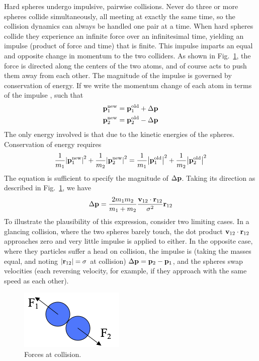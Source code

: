 \documentclass[]{article}
\begin{document}
Hard spheres undergo impulsive, pairwise collisions. Never do three or
more spheres collide simultaneously, all meeting at exactly the same
time, so the collision dynamics can always be handled one pair at a
time. When hard spheres collide they experience an infinite force over
an infinitesimal time, yielding an impulse (product of force and time)
that is finite. This impulse imparts an equal and opposite change in
momentum to the two colliders. As shown in Fig.~\ref{fig:force}, the force is
directed along the centers of the two atoms, and of course acts to push
them away from each other. The magnitude of the impulse is governed by
conservation of energy. If we write the momentum change of each atom in
terms of the impulse , such that
\begin{align*}
  &{\bf{p}}_1^{\rm new} = {\bf{p}}_1^{\rm old} + \Delta {\bf{p}}\\
  &{\bf{p}}_2^{\rm new} = {\bf{p}}_2^{\rm old} - \Delta {\bf{p}}
\end{align*}
The only energy involved is that due to the kinetic energies of the
spheres. Conservation of energy requires
\[\frac{1}{{{m_1}}}{\left| {{\bf{p}}_1^{\rm new}} \right|^2} + \frac{1}{{{m_2}}}{\left| {{\bf{p}}_2^{\rm new}} \right|^2} = \frac{1}{{{m_1}}}{\left| {{\bf{p}}_1^{\rm old}} \right|^2} + \frac{1}{{{m_2}}}{\left| {{\bf{p}}_2^{\rm old}} \right|^2}\]
The equation is sufficient to specify the magnitude of $\Delta {\bf{p}}$. Taking its
direction as described in Fig.~\ref{fig:force}, we have
\[\Delta {\bf{p}} = \frac{{2{m_1}{m_2}}}{{{m_1} + {m_2}}}\frac{{{{\bf{v}}_{12}} \cdot {{\bf{r}}_{12}}}}{{{\sigma ^2}}}{{\bf{r}}_{12}}\]
To illustrate the plausibility of this expression, consider two limiting
cases. In a glancing collision, where the two spheres barely touch, the
dot product ${\bf v}_{12}\cdot{\bf r}_{12}$ approaches zero and very little impulse is applied to
either. In the opposite case, where they particles suffer a head on
collision, the impulse is (taking the masses equal, and noting $|{\bf r}_{12}|=\sigma$ at
collision) $\Delta {\bf{p}} = {{\bf{p}}_2} - {{\bf{p}}_1}$, and the spheres swap velocities (each reversing velocity,
for example, if they approach with the same speed as each other).

\begin{figure}
  \centering
  \includegraphics[width=\textwidth]{HSMD_figures/image001}
  \caption{\label{fig:force}Forces at collision.}
\end{figure}
  
\end{document}
